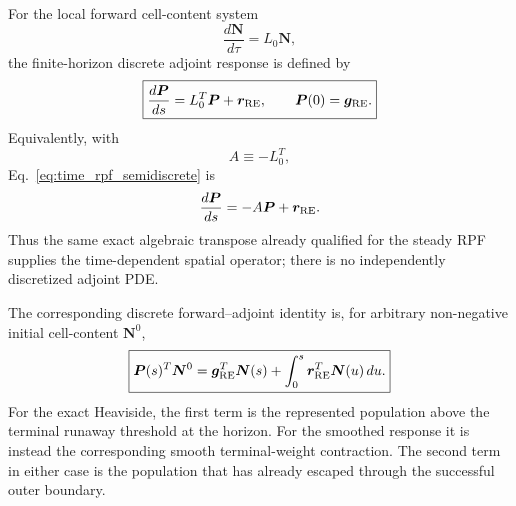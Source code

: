 \documentclass[11pt]{article}
\begin{document}
For the local forward cell-content system
\begin{equation}
 \frac{d\bm N}{d\tau}=L_0\bm N,
 \label{eq:time_rpf_forward_local}
\end{equation}
the finite-horizon discrete adjoint response is defined by
\begin{equation}
 \boxed{
 \frac{d\bm P}{ds}=L_0^T\bm P+\bm r_{\rm RE},
 \qquad
 \bm P(0)=\bm g_{\rm RE}.
 }
 \label{eq:time_rpf_semidiscrete}
\end{equation}
Equivalently, with
\begin{equation}
 A\equiv -L_0^T,
 \label{eq:time_rpf_A_definition}
\end{equation}
Eq.~\eqref{eq:time_rpf_semidiscrete} is
\begin{equation}
 \frac{d\bm P}{ds}=-A\bm P+\bm r_{\rm RE}.
 \label{eq:time_rpf_affine_A}
\end{equation}
Thus the same exact algebraic transpose already qualified for the steady RPF supplies
the time-dependent spatial operator; there is no independently discretized adjoint PDE.

The corresponding discrete forward--adjoint identity is, for arbitrary non-negative
initial cell-content $\bm N^0$,
\begin{equation}
 \boxed{
 \bm P(s)^T\bm N^0
 =\bm g_{\rm RE}^T\bm N(s)
 +\int_0^s \bm r_{\rm RE}^T\bm N(u)\,du.
 }
 \label{eq:time_rpf_finite_horizon_identity}
\end{equation}
For the exact Heaviside, the first term is the represented population above the terminal
runaway threshold at the horizon.  For the smoothed response it is instead the corresponding
smooth terminal-weight contraction.  The second term in either case is the population that
has already escaped through the successful outer boundary.
\end{document}
